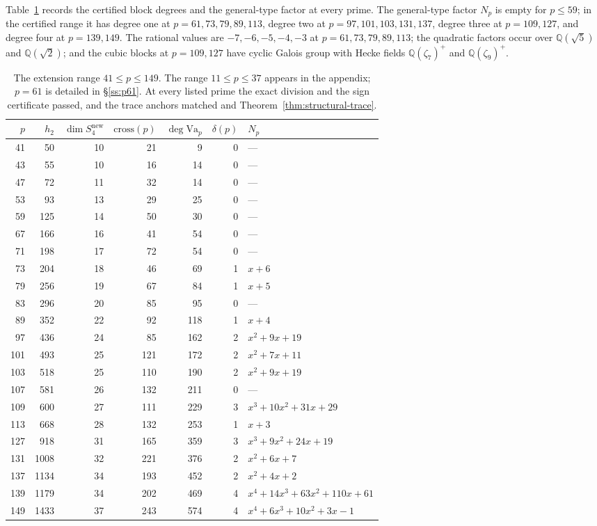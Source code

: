 \documentclass[11pt]{amsart}
\theoremstyle{plain}
\theoremstyle{definition}
\newcommand{\Q}{\mathbb{Q}}
\newcommand{\Va}{\mathrm{Va}}
\newcommand{\snew}{S^{\mathrm{new}}}
\providecommand{\Va}{\mathrm{Va}}
\providecommand{\snew}{S^{\mathrm{new}}}
\begin{document}
	Table~\ref{tab:ext} records the certified block degrees and the
	general-type factor at every prime. The general-type factor $N_p$ is empty
	for $p\le59$; in the certified range it has degree one at
	$p=61,73,79,89,113$, degree two at $p=97,101,103,131,137$, degree three
	at $p=109,127$, and degree four at $p=139,149$. The rational values are
	$-7,-6,-5,-4,-3$ at $p=61,73,79,89,113$; the quadratic factors occur over
	$\Q(\sqrt5)$ and $\Q(\sqrt2)$; and the cubic blocks at $p=109,127$ have
	cyclic Galois group with Hecke fields $\Q(\zeta_7)^+$ and
	$\Q(\zeta_9)^+$.
	
	\begin{table}[ht]
		\centering
		\small
		\begin{tabular}{@{}rrrrrrl@{}}
			\toprule
			$p$ & $h_2$ & $\dim\snew_4$ & $\mathrm{cross}(p)$ & $\deg\Va_p$ &
			$\delta(p)$ & $N_p$\\
			\midrule
			41 & 50 & 10 & 21 & 9 & 0 & ---\\
			43 & 55 & 10 & 16 & 14 & 0 & ---\\
			47 & 72 & 11 & 32 & 14 & 0 & ---\\
			53 & 93 & 13 & 29 & 25 & 0 & ---\\
			59 & 125 & 14 & 50 & 30 & 0 & ---\\
			67 & 166 & 16 & 41 & 54 & 0 & ---\\
			71 & 198 & 17 & 72 & 54 & 0 & ---\\
			73 & 204 & 18 & 46 & 69 & 1 & $x+6$\\
			79 & 256 & 19 & 67 & 84 & 1 & $x+5$\\
			83 & 296 & 20 & 85 & 95 & 0 & ---\\
			89 & 352 & 22 & 92 & 118 & 1 & $x+4$\\
			97 & 436 & 24 & 85 & 162 & 2 & $x^2+9x+19$\\
			101 & 493 & 25 & 121 & 172 & 2 & $x^2+7x+11$\\
			103 & 518 & 25 & 110 & 190 & 2 & $x^2+9x+19$\\
			107 & 581 & 26 & 132 & 211 & 0 & ---\\
			109 & 600 & 27 & 111 & 229 & 3 & $x^3+10x^2+31x+29$\\
			113 & 668 & 28 & 132 & 253 & 1 & $x+3$\\
			127 & 918 & 31 & 165 & 359 & 3 & $x^3+9x^2+24x+19$\\
			131 & 1008 & 32 & 221 & 376 & 2 & $x^2+6x+7$\\
			137 & 1134 & 34 & 193 & 452 & 2 & $x^2+4x+2$\\
			139 & 1179 & 34 & 202 & 469 & 4 & $x^4+14x^3+63x^2+110x+61$\\
			149 & 1433 & 37 & 243 & 574 & 4 & $x^4+6x^3+10x^2+3x-1$\\
			\bottomrule
		\end{tabular}
		\caption{The extension range $41\le p\le149$. The range $11\le p\le37$
			appears in the appendix; $p=61$ is detailed in \S\ref{ss:p61}. At every
			listed prime the exact division and the sign certificate passed, and the
			trace anchors matched \cite[Thm.~2, Rem.~3]{IbukiyamaKatsura} and
			Theorem~\ref{thm:structural-trace}.}
		\label{tab:ext}
	\end{table}
	
\end{document}
